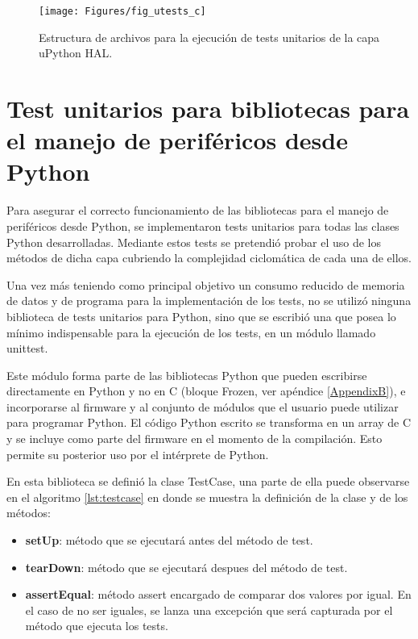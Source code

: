 \begin{figure}[ht]
  \centering
    \texttt{[image: Figures/fig\_utests\_c]}
  \caption{Estructura de archivos para la ejecución de tests unitarios de la capa uPython HAL.}
  \label{fig:utestcarq}
\end{figure}


\section{Test unitarios para bibliotecas para el manejo de periféricos desde Python}
\label{sec:testUnitariosPython}

Para asegurar el correcto funcionamiento de las bibliotecas para el manejo de periféricos desde Python, se implementaron tests unitarios para todas las clases Python desarrolladas. Mediante estos tests se pretendió probar el uso de los métodos de dicha capa cubriendo la complejidad ciclomática de cada una de ellos.

Una vez más teniendo como principal objetivo un consumo reducido de memoria de datos y de programa para la implementación de los tests, no se utilizó ninguna biblioteca de tests unitarios para Python, sino que se escribió una que posea lo mínimo indispensable para la ejecución de los tests, en un módulo llamado unittest. 

Este módulo forma parte de las bibliotecas Python que pueden escribirse directamente en Python y no en C (bloque Frozen, ver apéndice \ref{AppendixB}), e incorporarse al firmware y al conjunto de módulos que el usuario puede utilizar para programar Python. El código Python escrito se transforma en un array de C y se incluye como parte del firmware en el momento de la compilación. Esto permite su posterior uso por el intérprete de Python.

En esta biblioteca se definió la clase TestCase, una parte de ella puede observarse en el algoritmo \ref{lst:testcase} en donde se muestra la definición de la clase y de los métodos:

\begin{itemize}
	\item \textbf{setUp}: método que se ejecutará antes del método de test.
	\item \textbf{tearDown}: método que se ejecutará despues del método de test.
	\item \textbf{assertEqual}: método assert encargado de comparar dos valores por igual. En el caso de no ser iguales, se lanza una excepción que será capturada por el método que ejecuta los tests.
\end{itemize}

